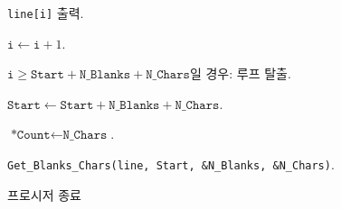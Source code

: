 \documentclass[runningheads]{../../../llncs}
\begin{document}
\begin{algorithm}
\begin{algorithm}
\begin{algorithm}
\begin{algorithm}
\begin{algorithm}
										\item \texttt{line[i]} 출력.
										\item $\texttt{i} \leftarrow \texttt{i} + 1$.
										\item $\texttt{i} \geq \texttt{Start} + \texttt{N_Blanks} + \texttt{N_Chars}$일 경우: 루프 탈출.
									\end{algorithm}
								\item $\texttt{Start} \leftarrow \texttt{Start} + \texttt{N_Blanks} + \texttt{N_Chars}$.
								\item $\texttt{*Count} \leftarrow \texttt{N_Chars}$.
								\item \texttt{Get_Blanks_Chars(line, Start, \&N_Blanks, \&N_Chars)}.
							\end{algorithm}
 					\end{algorithm}
			\end{algorithm} 
	\item 프로시저 종료
\end{algorithm}
\end{document}
